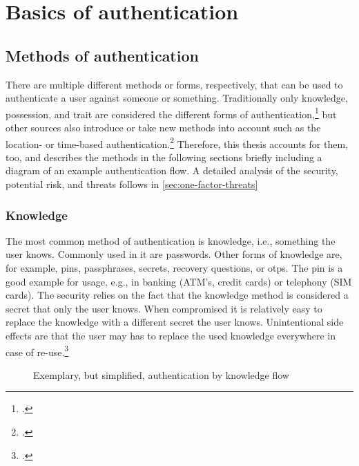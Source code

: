 \chapter{Basics of authentication}
\label{chapter:basics}

\section{Methods of authentication}
There are multiple different methods or forms, respectively, that can be used to authenticate a user against someone or something. Traditionally only knowledge, possession, and trait are considered the different forms of authentication,\footcites[See][299]{10.2307/27845364}[See][140]{brotherston2017defensive}[][47]{anderson2008security} but other sources also introduce or take new methods into account such as the location- or time-based authentication.\footcites[][]{6296127}[See][191]{dasgupta2017multi} Therefore, this thesis accounts for them, too, and describes the methods in the following sections briefly including a diagram of an example authentication flow. A detailed analysis of the security, potential risk, and threats follows in \autoref{sec:one-factor-threats}

\subsection{Knowledge}

The most common method of authentication is knowledge, i.e., \frqq something the user knows\flqq{}. Commonly used in \gls{it} are passwords. Other forms of knowledge are, for example, \glspl{pin}, passphrases, secrets, recovery questions, or \glspl{otp}. The \gls{pin} is a good example for usage, e.g., in banking (ATM's, credit cards) or telephony (SIM cards). The security relies on the fact that the knowledge method is considered a secret that only the user knows. When compromised it is relatively easy to replace the knowledge with a different secret the user knows. Unintentional side effects are that the user may has to replace the used knowledge everywhere in case of re-use.\footcite[See][467]{eckert-it-sec-9}

\newpage

\begin{figure}[hbt]
	\centering
	
	\caption[Exemplary, but simplified, authentication by knowledge flow]{Exemplary, but simplified, authentication by knowledge flow\footnotemark}
	\label{fig:knowledge_auth_flow}
\end{figure}

